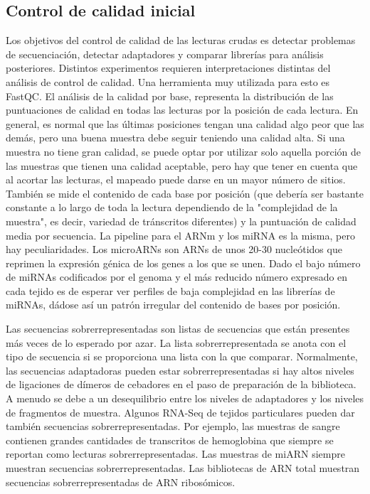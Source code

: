 \subsection{Control de calidad inicial}
Los objetivos del control de calidad de las lecturas crudas es detectar problemas de secuenciación, detectar adaptadores y comparar librerías para análisis posteriores. Distintos experimentos requieren interpretaciones distintas del análisis de control de calidad. Una herramienta muy utilizada para esto es FastQC. El análisis de la calidad por base, representa la distribución de las puntuaciones de calidad en todas las lecturas por la posición de cada lectura. En general, es normal que las últimas posiciones tengan una calidad algo peor que las demás, pero una buena muestra debe seguir teniendo una calidad alta. Si una muestra no tiene gran calidad, se puede optar por utilizar solo aquella porción de las muestras que tienen una calidad aceptable, pero hay que tener en cuenta que al acortar las lecturas, el mapeado puede darse en un mayor número de sitios. También se mide el contenido de cada base por posición (que debería ser bastante constante a lo largo de toda la lectura dependiendo de la "complejidad de la muestra", es decir, variedad de tránscritos diferentes) y la puntuación de calidad media por secuencia. La pipeline para el ARNm y los miRNA es la misma, pero hay peculiaridades. Los microARNs son ARNs de unos 20-30 nucleótidos que reprimen la expresión génica de los genes a los que se unen.
Dado el bajo número de miRNAs codificados por el genoma y el más reducido número expresado en cada tejido es de esperar ver perfiles de baja complejidad en las librerías de miRNAs, dádose así un patrón irregular del contenido de bases por posición.

Las secuencias sobrerrepresentadas son listas de secuencias que están presentes más veces de lo esperado por azar. La lista sobrerrepresentada se anota con el tipo de secuencia si se proporciona una lista con la que comparar. Normalmente, las secuencias adaptadoras pueden estar sobrerrepresentadas si hay altos niveles de ligaciones de dímeros de cebadores en el paso de preparación de la biblioteca. A menudo se debe a un desequilibrio entre los niveles de adaptadores y los niveles de fragmentos de muestra. Algunos RNA-Seq de tejidos particulares pueden dar también secuencias sobrerrepresentadas. Por ejemplo, las muestras de sangre contienen grandes cantidades de transcritos de hemoglobina que siempre se reportan como lecturas sobrerrepresentadas. Las muestras de miARN siempre muestran secuencias sobrerrepresentadas. Las bibliotecas de ARN total muestran secuencias sobrerrepresentadas de ARN ribosómicos.

